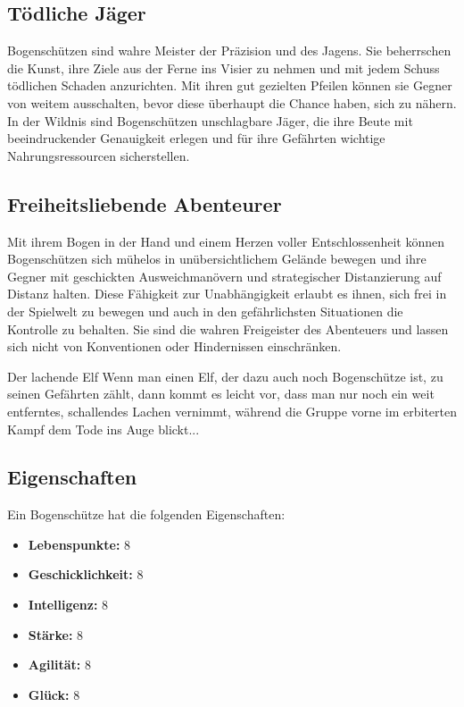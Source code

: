\documentclass[letterpaper,twocolumn,openany,nodeprecatedcode]{dndbook}
\begin{document}
\subsection{Tödliche Jäger}
Bogenschützen sind wahre Meister der Präzision und des Jagens. Sie beherrschen die Kunst, ihre Ziele aus der Ferne ins Visier zu nehmen und mit jedem Schuss tödlichen Schaden anzurichten. Mit ihren gut gezielten Pfeilen können sie Gegner von weitem ausschalten, bevor diese überhaupt die Chance haben, sich zu nähern. In der Wildnis sind Bogenschützen unschlagbare Jäger, die ihre Beute mit beeindruckender Genauigkeit erlegen und für ihre Gefährten wichtige Nahrungsressourcen sicherstellen.

\subsection{Freiheitsliebende Abenteurer} Mit ihrem Bogen in der Hand und einem Herzen voller Entschlossenheit können Bogenschützen sich mühelos in unübersichtlichem Gelände bewegen und ihre Gegner mit geschickten Ausweichmanövern und strategischer Distanzierung auf Distanz halten. Diese Fähigkeit zur Unabhängigkeit erlaubt es ihnen, sich frei in der Spielwelt zu bewegen und auch in den gefährlichsten Situationen die Kontrolle zu behalten. Sie sind die wahren Freigeister des Abenteuers und lassen sich nicht von Konventionen oder Hindernissen einschränken.

\begingroup
\DndSetThemeColor[PhbMauve]
\begin{DndSidebar}{Der lachende Elf}
  Wenn man einen Elf, der dazu auch noch Bogenschütze ist, zu seinen Gefährten zählt, dann kommt es leicht vor, dass man nur noch ein weit entferntes, schallendes Lachen vernimmt, während die Gruppe vorne im erbiterten Kampf dem Tode ins Auge blickt...
\end{DndSidebar}
\endgroup
\subsection{Eigenschaften}
Ein Bogenschütze hat die folgenden Eigenschaften:

\begin{itemize}
    \item \textbf{Lebenspunkte:} 8 
    \item \textbf{Geschicklichkeit:} 8 
    \item \textbf{Intelligenz:} 8 
    \item \textbf{Stärke:} 8 
    \item \textbf{Agilität:} 8 
    \item \textbf{Glück:} 8
\end{itemize}
\end{document}
